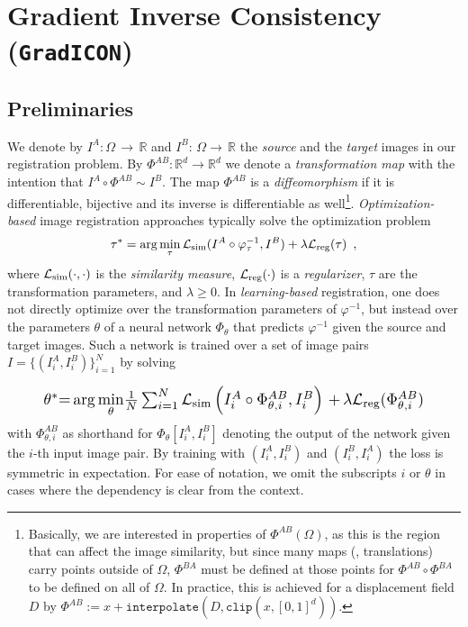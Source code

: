 \vspace{-0.15cm}
\section{Gradient Inverse Consistency (\texttt{GradICON})}
\label{sec:gradinv}
\vspace{-0.15cm}
\subsection{Preliminaries}
\label{subsec:preliminaries}
\vspace{-0.15cm}
We denote by $I^A:\Omega\,{\to}\,\mathds{R}$ and
$I^B:\,\Omega{\to}\,\mathds{R}$ the \emph{source} and the \emph{target} images in our registration problem. By $\Phi^{AB}: \mathds{R}^d\to\mathds{R}^d$ we denote a \emph{transformation map} with the intention that $I^A \circ \Phi^{AB} \sim I^B$. The map $\Phi^{AB}$ is a \emph{diffeomorphism} if it is differentiable, bijective and its inverse %
is differentiable as well\footnote{Basically, we are interested in properties of $\Phi^{AB}(\Omega)$, as this is the region that can affect the image similarity, but since many maps (\eg, translations) carry points outside of $\Omega$, $\Phi^{BA}$ must be defined at those points for $\Phi^{AB} \circ \Phi^{BA}$ to be defined on all of $\Omega$. In practice, this is achieved for a displacement field $D$ by $\Phi^{AB}:=  x + \texttt{interpolate}(D, \texttt{clip}(x, [0, 1]^d))$.
}.
\emph{Optimization-based} image registration approaches typically solve the optimization problem %
\begin{equation}
	\label{equ:conventional_registration}
	\tau^*=\arg\min_{\tau}\mathcal{L}_{\text{sim}}(I^A\circ\varphi^{-1}_{\tau},I^B)+\lambda \mathcal{L}_{\text{reg}}(\tau)\enspace,
\end{equation}
where $\mathcal{L}_{\text{sim}}(\cdot,\cdot)$ is the \emph{similarity measure}, $\mathcal{L}_{\text{reg}}(\cdot)$ is a \emph{regularizer}, $\tau$ are the transformation parameters, and $\lambda\geq 0$. In \emph{learning-based} registration, one does not directly optimize over the transformation parameters of $\varphi^{-1}$, but instead over the parameters $\theta$ of a neural network $\Phi_\theta$ that predicts $\varphi^{-1}$ given the source and target images. Such a network is trained over a set of image pairs $I=\{(I^A_i, I^B_i)\}_{i=1}^N$ by solving

\begin{equation}
\resizebox{0.9 \columnwidth}{!}{
    $\theta^*{=}\arg\underset{\theta}{\min} \frac{1}{N}\sum_{i=1}^N \lsim\left(I^A_i\circ\Phi^{AB}_{\theta,i},I^B_i\right)\,{+}\,
        \lambda\lreg(\Phi^{AB}_{\theta,i})$
}\label{eq:learning_loss}
\end{equation}
with $\Phi^{AB}_{\theta,i}$ as shorthand for  $\Phi_\theta[I^A_i, I^B_i]$ denoting the output of the network given the $i$-th input image pair.  By training with $(I_i^A,I_i^B)$ and $(I_i^B,I_i^A)$ the loss is symmetric in expectation. For ease of notation, we omit the subscripts $i$ or $\theta$ in cases where the dependency is clear from the context.

